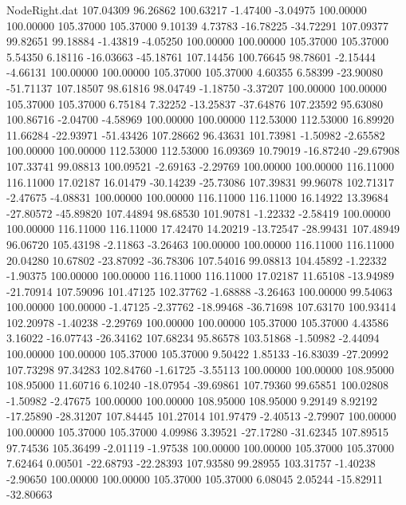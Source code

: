 \begin{filecontents}{NodeRight.dat}
 107.04309   96.26862  100.63217    -1.47400   -3.04975  100.00000  100.00000  105.37000  105.37000    9.10139    4.73783  -16.78225  -34.72291
 107.09377   99.82651   99.18884    -1.43819   -4.05250  100.00000  100.00000  105.37000  105.37000    5.54350    6.18116  -16.03663  -45.18761
 107.14456  100.76645   98.78601    -2.15444   -4.66131  100.00000  100.00000  105.37000  105.37000    4.60355    6.58399  -23.90080  -51.71137
 107.18507   98.61816   98.04749    -1.18750   -3.37207  100.00000  100.00000  105.37000  105.37000    6.75184    7.32252  -13.25837  -37.64876
 107.23592   95.63080  100.86716    -2.04700   -4.58969  100.00000  100.00000  112.53000  112.53000   16.89920   11.66284  -22.93971  -51.43426
 107.28662   96.43631  101.73981    -1.50982   -2.65582  100.00000  100.00000  112.53000  112.53000   16.09369   10.79019  -16.87240  -29.67908
 107.33741   99.08813  100.09521    -2.69163   -2.29769  100.00000  100.00000  116.11000  116.11000   17.02187   16.01479  -30.14239  -25.73086
 107.39831   99.96078  102.71317    -2.47675   -4.08831  100.00000  100.00000  116.11000  116.11000   16.14922   13.39684  -27.80572  -45.89820
 107.44894   98.68530  101.90781    -1.22332   -2.58419  100.00000  100.00000  116.11000  116.11000   17.42470   14.20219  -13.72547  -28.99431
 107.48949   96.06720  105.43198    -2.11863   -3.26463  100.00000  100.00000  116.11000  116.11000   20.04280   10.67802  -23.87092  -36.78306
 107.54016   99.08813  104.45892    -1.22332   -1.90375  100.00000  100.00000  116.11000  116.11000   17.02187   11.65108  -13.94989  -21.70914
 107.59096  101.47125  102.37762    -1.68888   -3.26463  100.00000   99.54063  100.00000  100.00000   -1.47125   -2.37762  -18.99468  -36.71698
 107.63170  100.93414  102.20978    -1.40238   -2.29769  100.00000  100.00000  105.37000  105.37000    4.43586    3.16022  -16.07743  -26.34162
 107.68234   95.86578  103.51868    -1.50982   -2.44094  100.00000  100.00000  105.37000  105.37000    9.50422    1.85133  -16.83039  -27.20992
 107.73298   97.34283  102.84760    -1.61725   -3.55113  100.00000  100.00000  108.95000  108.95000   11.60716    6.10240  -18.07954  -39.69861
 107.79360   99.65851  100.02808    -1.50982   -2.47675  100.00000  100.00000  108.95000  108.95000    9.29149    8.92192  -17.25890  -28.31207
 107.84445  101.27014  101.97479    -2.40513   -2.79907  100.00000  100.00000  105.37000  105.37000    4.09986    3.39521  -27.17280  -31.62345
 107.89515   97.74536  105.36499    -2.01119   -1.97538  100.00000  100.00000  105.37000  105.37000    7.62464    0.00501  -22.68793  -22.28393
 107.93580   99.28955  103.31757    -1.40238   -2.90650  100.00000  100.00000  105.37000  105.37000    6.08045    2.05244  -15.82911  -32.80663

\end{filecontents}
